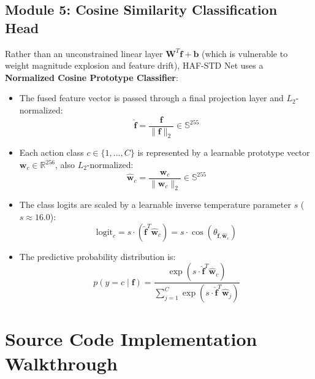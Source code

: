 \documentclass[a4paper, 11pt]{article}
\begin{document}
\subsection{Module 5: Cosine Similarity Classification Head}
Rather than an unconstrained linear layer $\mathbf{W}^T \mathbf{f} + \mathbf{b}$ (which is vulnerable to weight magnitude explosion and feature drift), HAF-STD Net uses a \textbf{Normalized Cosine Prototype Classifier}:
\begin{itemize}
    \item The fused feature vector is passed through a final projection layer and $L_2$-normalized:
    \begin{equation}
        \hat{\mathbf{f}} = \frac{\mathbf{f}}{\|\mathbf{f}\|_2} \in \mathbb{S}^{255}
    \end{equation}
    \item Each action class $c \in \{1, \dots, C\}$ is represented by a learnable prototype vector $\mathbf{w}_c \in \mathbb{R}^{256}$, also $L_2$-normalized:
    \begin{equation}
        \hat{\mathbf{w}}_c = \frac{\mathbf{w}_c}{\|\mathbf{w}_c\|_2} \in \mathbb{S}^{255}
    \end{equation}
    \item The class logits are scaled by a learnable inverse temperature parameter $s$ ($s \approx 16.0$):
    \begin{equation}
        \text{logit}_c = s \cdot (\hat{\mathbf{f}}^T \hat{\mathbf{w}}_c) = s \cdot \cos(\theta_{\hat{\mathbf{f}}, \hat{\mathbf{w}}_c})
    \end{equation}
    \item The predictive probability distribution is:
    \begin{equation}
        p(y = c \mid \mathbf{f}) = \frac{\exp\left(s \cdot \hat{\mathbf{f}}^T \hat{\mathbf{w}}_c\right)}{\sum_{j=1}^{C} \exp\left(s \cdot \hat{\mathbf{f}}^T \hat{\mathbf{w}}_j\right)}
    \end{equation}
\end{itemize}

\vspace{0.3cm}

\section{Source Code Implementation Walkthrough}
\end{document}
